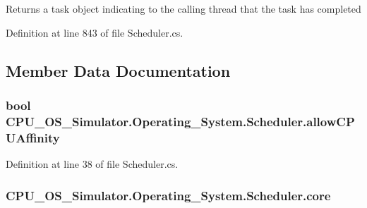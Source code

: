 \begin{DoxyReturn}{Returns}
a task object indicating to the calling thread that the task has completed
\end{DoxyReturn}


Definition at line 843 of file Scheduler.\+cs.



\subsection{Member Data Documentation}
\hypertarget{class_c_p_u___o_s___simulator_1_1_operating___system_1_1_scheduler_a732d4b0d95cad3e280f9b69dd4f9f7c4}{}
\subsubsection[{allow\+C\+P\+U\+Affinity}]{\setlength{\rightskip}{0pt plus 5cm}bool C\+P\+U\+\_\+\+O\+S\+\_\+\+Simulator.\+Operating\+\_\+\+System.\+Scheduler.\+allow\+C\+P\+U\+Affinity\hspace{0.3cm}{\ttfamily [private]}}\label{class_c_p_u___o_s___simulator_1_1_operating___system_1_1_scheduler_a732d4b0d95cad3e280f9b69dd4f9f7c4}


Definition at line 38 of file Scheduler.\+cs.

\hypertarget{class_c_p_u___o_s___simulator_1_1_operating___system_1_1_scheduler_ae49e3179fe53d59e3898adb9d0ff1827}{}
\subsubsection[{core}]{ C\+P\+U\+\_\+\+O\+S\+\_\+\+Simulator.\+Operating\+\_\+\+System.\+Scheduler.\+core\hspace{0.3cm}{\ttfamily [private]}}\label{class_c_p_u___o_s___simulator_1_1_operating___system_1_1_scheduler_ae49e3179fe53d59e3898adb9d0ff1827}


